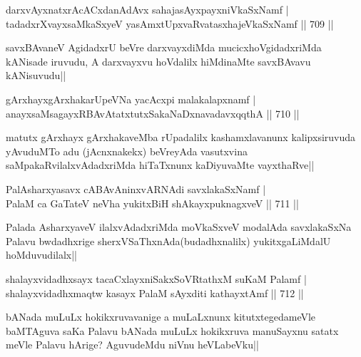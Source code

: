 \begin{shl}
darxvAyxnatxrAcACxdanAdAvx sahajasAyxpayxniVkaSxNamf | \\
tadadxrXvayxsaMkaSxyeV yasAmxtUpxvaRvatasxhajeVkaSxNamf \hfill||  709 ||  
\end{shl}

\begin{artha}
savxBAvaneV AgidadxrU beVre darxvayxdiMda mucicxhoVgidadxriMda kANisade iruvudu, A darxvayxvu hoVdalilx hiMdinaMte savxBAvavu kANisuvudu||
\end{artha}


\begin{shl}
gArxhayxgArxhakarUpeVNa yacAcxpi malakalapxnamf | \\
anayxsaMsagayxRBAvAtatxtutxSakaNaDxnavadavxqqthA \hfill||  710 ||  
\end{shl}

\begin{artha}
matutx gArxhayx gArxhakaveMba rUpadalilx kashamxlavanunx kalipxsiruvuda yAvuduMTo adu (jAcnxnakekx) beVreyAda vasutxvina saMpakaRvilalxvAdadxriMda hiTaTxnunx kaDiyuvaMte vayxthaRve||
\end{artha}


\begin{shl}
PalAsharxyasavx cABAvAninxvARNAdi savxlakaSxNamf | \\
PalaM ca GaTateV neVha yukitxBiH shAkayxpuknagxveV \hfill||  711 ||  
\end{shl}

\begin{artha}
Palada AsharxyaveV ilalxvAdadxriMda moVkaSxveV modalAda savxlakaSxNa Palavu bwdadhxrige sherxVSaThxnAda(budadhxnalilx) yukitxgaLiMdalU hoMduvudilalx||
\end{artha}


\begin{shl}
shalayxvidadhxsayx tacaCxlayxniSakxSoVRtathxM suKaM Palamf | \\
shalayxvidadhxmaqtw kasayx PalaM sAyxditi kathayxtAmf \hfill||  712 ||  
\end{shl}

\begin{artha}
bANada muLuLx hokikxruvavanige a muLaLxnunx kitutxtegedameVle baMTAguva saKa Palavu bANada muLuLx hokikxruva manuSayxnu satatx meVle Palavu hArige? AguvudeMdu niVnu heVLabeVku||
\end{artha}

